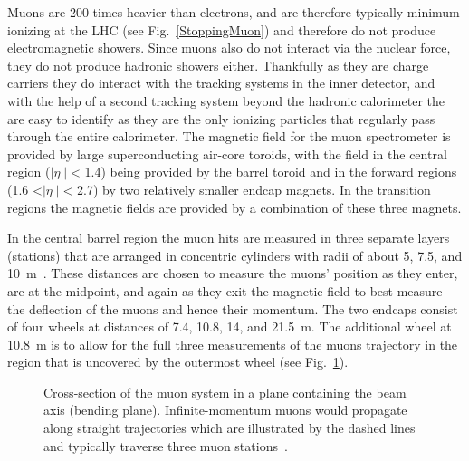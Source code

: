 Muons are 200 times heavier than electrons, and are therefore typically minimum ionizing at the LHC (see Fig.~\ref{StoppingMuon}) and therefore do not produce electromagnetic showers.  
Since muons also do not interact via the nuclear force, they do not produce hadronic showers either.  
Thankfully as they are charge carriers they do interact with the tracking systems in the inner detector, and with the help of a second tracking system beyond the hadronic calorimeter the are easy to identify as they are the only ionizing particles that regularly pass through the entire calorimeter.  
The magnetic field for the muon spectrometer is provided by large superconducting air-core toroids, with the field in the central region ($\mid\eta\mid$< 1.4) being provided by the barrel toroid and in the forward regions (1.6 <$\mid\eta\mid$< 2.7) by two relatively smaller endcap magnets.  
In the transition regions the magnetic fields are provided by a combination of these three magnets.  

In the central barrel region the muon hits are measured in three separate layers (stations) that are arranged in concentric cylinders with radii of about 5, 7.5, and 10~m~\cite{MuonTDR}.  
These distances are chosen to measure the muons' position as they enter, are at the midpoint, and again as they exit the magnetic field to best measure the deflection of the muons and hence their momentum.  
The two endcaps consist of four wheels at distances of 7.4, 10.8, 14, and 21.5~m. 
The additional wheel at 10.8~m is to allow for the full three measurements of the muons trajectory in the region that is uncovered by the outermost wheel (see Fig.~\ref{MuonSpectroFig}).


\begin{figure}[!ht]
  \begin{center}
  \end{center}
  \caption[Stopping power for positive muons in copper.]
      {\small Cross-section of the muon system in a plane containing the beam axis (bending plane). Infinite-momentum muons would propagate along straight trajectories which are illustrated by the dashed lines and typically traverse three muon stations~\cite{JOIATLAS}.}
  \label{MuonSpectroFig}
\end{figure}

